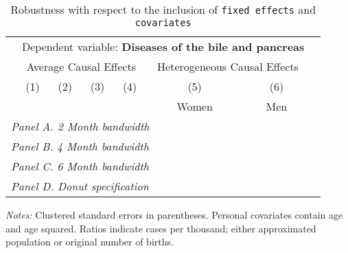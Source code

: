  \begin{table}[H] \begin{threeparttable} \centering \caption{Robustness with respect to the inclusion of \texttt{fixed effects} and \texttt{covariates}} {\def\sym#1{\ifmmode^{#1}\else\(^{#1}\)\fi} \begin{tabular}{l*{7}{c}} \toprule & \multicolumn{6}{c}{Dependent variable: \textbf{Diseases of the bile and pancreas}} \\ \cmidrule(lr){2-7}
            &\multicolumn{4}{c}{Average Causal Effects}         &\multicolumn{2}{c}{Heterogeneous Causal Effects}\\\cmidrule(lr){2-5}\cmidrule(lr){6-7}
            &\multicolumn{1}{c}{(1)}&\multicolumn{1}{c}{(2)}&\multicolumn{1}{c}{(3)}&\multicolumn{1}{c}{(4)}&\multicolumn{1}{c}{(5)}&\multicolumn{1}{c}{(6)}\\
            &\multicolumn{1}{c}{}&\multicolumn{1}{c}{}&\multicolumn{1}{c}{}&\multicolumn{1}{c}{}&\multicolumn{1}{c}{Women}&\multicolumn{1}{c}{Men}\\
\midrule
 \multicolumn{7}{l}{\emph{Panel A. 2 Month bandwidth}} \\    \midrule\multicolumn{7}{l}{\emph{Panel B. 4 Month bandwidth}} \\    \midrule\multicolumn{7}{l}{\emph{Panel C. 6 Month bandwidth}} \\    \midrule\multicolumn{7}{l}{\emph{Panel D. Donut specification}} \\    \midrule  
\bottomrule \end{tabular} } \begin{tablenotes} \item \scriptsize \emph{Notes:} Clustered standard errors in parentheses. Personal covariates contain age and age squared. Ratios indicate cases per thousand; either approximated population or original number of births. \end{tablenotes} \end{threeparttable} \end{table} 
